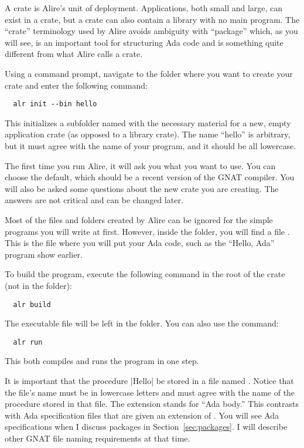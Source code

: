 A crate is Alire's unit of deployment. Applications, both small and large, can exist in a crate,
but a crate can also contain a library with no main program. The ``crate'' terminology used by
Alire avoids ambiguity with ``package'' which, as you will see, is an important tool for
structuring Ada code and is something quite different from what Alire calls a crate.

Using a command prompt, navigate to the folder where you want to create your crate and enter the
following command:

\begin{Verbatim}
  alr init --bin hello
\end{Verbatim}

\noindent This initializes a subfolder named  with the necessary material for a
new, empty application crate (as opposed to a library crate). The name ``hello'' is arbitrary,
but it must agree with the name of your program, and it should be all lowercase.

The first time you run Alire, it will ask you what  you want to use. You can
choose the default, which should be a recent version of the GNAT compiler. You will also be
asked some questions about the new crate you are creating. The answers are not critical and can
be changed later.

Most of the files and folders created by Alire can be ignored for the simple programs you will
write at first. However, inside the  folder, you will find a file
. This is the file where you will put your Ada code, such as the
``Hello, Ada'' program show earlier.

To build the program, execute the following command in the root of the crate (not in the
 folder): 

\begin{Verbatim}
  alr build
\end{Verbatim}

\noindent The executable file will be left in the  folder. You can also use the
command:

\begin{Verbatim}
  alr run
\end{Verbatim}

\noindent This both compiles and runs the program in one step.

It is important that the procedure |Hello| be stored in a file named .
Notice that the file's name must be in lowercase letters and must agree with the name of the
procedure stored in that file. The  extension stands for ``Ada body.'' This
contrasts with Ada specification files that are given an extension of . You will
see Ada specifications when I discuss packages in Section~\ref{sec:packages}. I will describe
other GNAT file naming requirements at that time.

